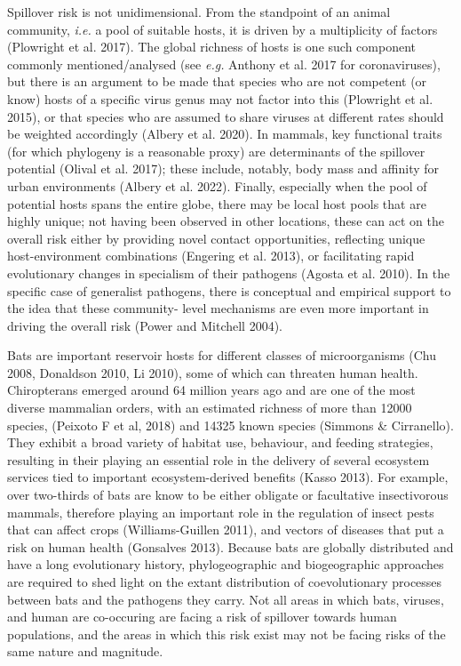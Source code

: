 \documentclass[11pt]{article}
\begin{document}
Spillover risk is not unidimensional. From the standpoint of an animal
community, \emph{i.e.} a pool of suitable hosts, it is driven by a
multiplicity of factors (Plowright et al. 2017). The global richness of
hosts is one such component commonly mentioned/analysed (see \emph{e.g.}
Anthony et al. 2017 for coronaviruses), but there is an argument to be
made that species who are not competent (or know) hosts of a specific
virus genus may not factor into this (Plowright et al. 2015), or that
species who are assumed to share viruses at different rates should be
weighted accordingly (Albery et al. 2020). In mammals, key functional
traits (for which phylogeny is a reasonable proxy) are determinants of
the spillover potential (Olival et al. 2017); these include, notably,
body mass and affinity for urban environments (Albery et al. 2022).
Finally, especially when the pool of potential hosts spans the entire
globe, there may be local host pools that are highly unique; not having
been observed in other locations, these can act on the overall risk
either by providing novel contact opportunities, reflecting unique
host-environment combinations (Engering et al. 2013), or facilitating
rapid evolutionary changes in specialism of their pathogens (Agosta et
al. 2010). In the specific case of generalist pathogens, there is
conceptual and empirical support to the idea that these community- level
mechanisms are even more important in driving the overall risk (Power
and Mitchell 2004).

Bats are important reservoir hosts for different classes of
microorganisms (Chu 2008, Donaldson 2010, Li 2010), some of which can
threaten human health. Chiropterans emerged around 64 million years ago
and are one of the most diverse mammalian orders, with an estimated
richness of more than 12000 species, (Peixoto F et al, 2018) and 14325
known species (Simmons \& Cirranello). They exhibit a broad variety of
habitat use, behaviour, and feeding strategies, resulting in their
playing an essential role in the delivery of several ecosystem services
tied to important ecosystem-derived benefits (Kasso 2013). For example,
over two-thirds of bats are know to be either obligate or facultative
insectivorous mammals, therefore playing an important role in the
regulation of insect pests that can affect crops (Williams-Guillen
2011), and vectors of diseases that put a risk on human health
(Gonsalves 2013). Because bats are globally distributed and have a long
evolutionary history, phylogeographic and biogeographic approaches are
required to shed light on the extant distribution of coevolutionary
processes between bats and the pathogens they carry. Not all areas in
which bats, viruses, and human are co-occuring are facing a risk of
spillover towards human populations, and the areas in which this risk
exist may not be facing risks of the same nature and magnitude.
\end{document}
